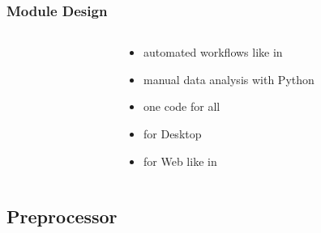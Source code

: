 \documentclass{beamer}
\begin{document}
\begin{frame}\frametitle{Module Design}
    \begin{columns}
        \begin{column}{.5\textwidth}
            \centerline{\theimage}
        \end{column}
        
        \begin{column}{.5\textwidth}
            \vspace{-2em}
            \begin{itemize}
            \item automated workflows like in \aiida{}
            \item manual data analysis with Python
            \end{itemize}
            \hdashrule{\textwidth}{1pt}{1pt}
            \begin{itemize}
            \item one code for all
            \end{itemize}
            \hdashrule{\textwidth}{1pt}{1pt}
            \begin{itemize}
            \item for Desktop \faDesktop{}
            \item for Web \faGlobe{} like in \aiidalab{}
            \end{itemize}
        \end{column}
    \end{columns}


    
    
    
\end{frame}

\subsection{Preprocessor}
\label{sec:preprocessor}
\end{document}
